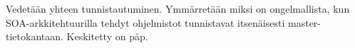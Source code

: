 Vedetään yhteen tunnistautuminen. Ymmärretään miksi on ongelmallista, kun SOA-arkkitehtuurilla tehdyt ohjelmistot tunnistavat itsenäisesti master-tietokantaan. Keskitetty on påp.